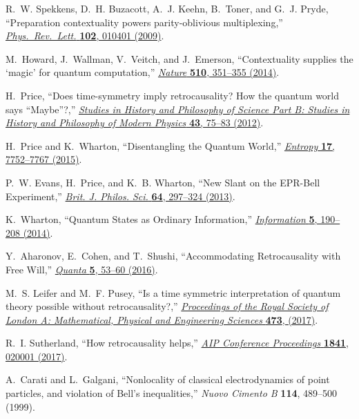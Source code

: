 \documentclass[a4paper,onecolumn,11pt,accepted=2018-05-04]{quantumarticle}
\begin{document}
\begin{thebibliography}{10}
R.~W. Spekkens, D.~H. Buzacott, A.~J. Keehn, B.~Toner, and G.~J. Pryde,
  ``Preparation contextuality powers parity-oblivious multiplexing,''
  \href{https://doi.org/10.1103/PhysRevLett.102.010401}{{\em
  Phys.\ Rev.\ Lett.} {\bfseries 102}, 010401 (2009)}.

M.~Howard, J.~Wallman, V.~Veitch, and J.~Emerson, ``Contextuality supplies the
  `magic' for quantum computation,''
  \href{http://dx.doi.org/10.1038/nature13460}{{\em Nature}
  {\bfseries 510}, 351--355 (2014)}.

H.~Price, ``Does time-symmetry imply retrocausality? How the quantum world says
  “Maybe”?,''
  \href{https://doi.org/10.1016/j.shpsb.2011.12.003}{{\em
  Studies in History and Philosophy of Science Part B: Studies in History and
  Philosophy of Modern Physics} {\bfseries 43}, 75--83 (2012)}.

H.~Price and K.~Wharton, ``Disentangling the Quantum World,''
  \href{http://dx.doi.org/10.3390/e17117752}{{\em Entropy} {\bfseries 17},
  7752--7767 (2015)}.

P.~W. Evans, H.~Price, and K.~B. Wharton, ``New Slant on the EPR-Bell
  Experiment,'' \href{http://dx.doi.org/10.1093/bjps/axr052}{{\em Brit. J.
  Philos. Sci.} {\bfseries 64}, 297--324 (2013)}.

K.~Wharton, ``Quantum States as Ordinary Information,''
  \href{http://dx.doi.org/10.3390/info5010190}{{\em Information} {\bfseries 5},
  190--208 (2014)}.

Y.~Aharonov, E.~Cohen, and T.~Shushi, ``Accommodating Retrocausality with Free
  Will,'' \href{http://dx.doi.org/10.12743/quanta.v5i1.44}{{\em Quanta}
  {\bfseries 5}, 53--60 (2016)}.

M.~S. Leifer and M.~F. Pusey, ``Is a time symmetric interpretation of quantum
  theory possible without retrocausality?,''
  \href{http://dx.doi.org/10.1098/rspa.2016.0607}{{\em Proceedings of the Royal
  Society of London A: Mathematical, Physical and Engineering Sciences}
  {\bfseries 473}, (2017)}.

R.~I. Sutherland, ``How retrocausality helps,''
  \href{https://doi.org/10.1063/1.4982765}{{\em
  AIP Conference Proceedings} {\bfseries 1841}, 020001 (2017)}.

A.~Carati and L.~Galgani, ``Nonlocality of classical electrodynamics of point
  particles, and violation of Bell's inequalities,''
	{\em
  Nuovo Cimento B} {\bfseries 114}, 489--500 (1999).


\end{thebibliography}
\end{document}
